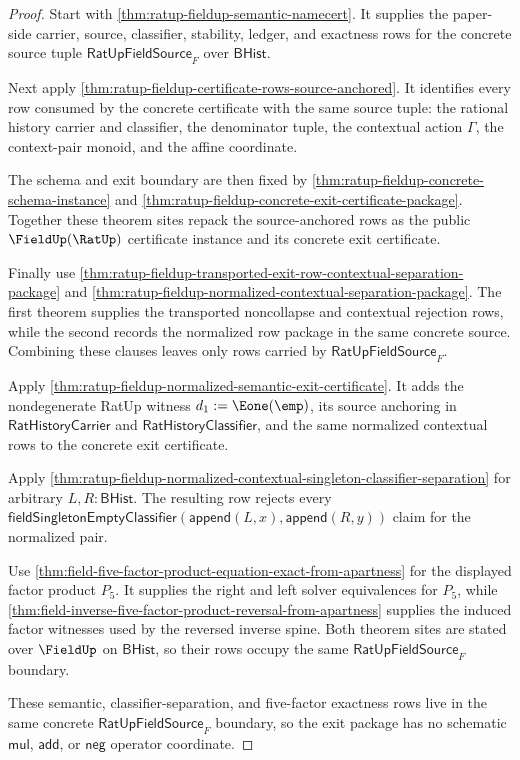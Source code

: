 \begin{proof}
Start with \autoref{thm:ratup-fieldup-semantic-namecert}. It supplies the
paper-side carrier, source, classifier, stability, ledger, and exactness rows
for the concrete source tuple $\mathsf{RatUpFieldSource}_F$ over
$\mathsf{BHist}$.

Next apply \autoref{thm:ratup-fieldup-certificate-rows-source-anchored}. It
identifies every row consumed by the concrete certificate with the same source
tuple: the rational history carrier and classifier, the denominator tuple, the
contextual action $\Gamma$, the context-pair monoid, and the affine coordinate.

The schema and exit boundary are then fixed by
\autoref{thm:ratup-fieldup-concrete-schema-instance} and
\autoref{thm:ratup-fieldup-concrete-exit-certificate-package}. Together these
theorem sites repack the source-anchored rows as the public
$\FieldUp(\RatUp)$ certificate instance and its concrete exit certificate.

Finally use
\autoref{thm:ratup-fieldup-transported-exit-row-contextual-separation-package}
and \autoref{thm:ratup-fieldup-normalized-contextual-separation-package}. The
first theorem supplies the transported noncollapse and contextual rejection
rows, while the second records the normalized row package in the same concrete
source. Combining these clauses leaves only rows carried by
$\mathsf{RatUpFieldSource}_F$.

Apply \autoref{thm:ratup-fieldup-normalized-semantic-exit-certificate}. It
adds the nondegenerate RatUp witness $d_1:=\Eone(\emp)$, its source anchoring in
$\mathsf{RatHistoryCarrier}$ and $\mathsf{RatHistoryClassifier}$, and the same
normalized contextual rows to the concrete exit certificate.

Apply
\autoref{thm:ratup-fieldup-normalized-contextual-singleton-classifier-separation}
for arbitrary $L,R:\mathsf{BHist}$. The resulting row rejects every
$\mathsf{fieldSingletonEmptyClassifier}(\mathsf{append}(L,x),\mathsf{append}(R,y))$
claim for the normalized pair.

Use \autoref{thm:field-five-factor-product-equation-exact-from-apartness} for
the displayed factor product $P_5$. It supplies the right and left solver
equivalences for $P_5$, while
\autoref{thm:field-inverse-five-factor-product-reversal-from-apartness} supplies
the induced factor witnesses used by the reversed inverse spine. Both theorem
sites are stated over $\FieldUp$ on $\mathsf{BHist}$, so their rows occupy the
same $\mathsf{RatUpFieldSource}_F$ boundary.

These semantic, classifier-separation, and five-factor exactness rows live in
the same concrete $\mathsf{RatUpFieldSource}_F$ boundary, so the exit package
has no schematic $\mathsf{mul}$, $\mathsf{add}$, or $\mathsf{neg}$ operator
coordinate.
\end{proof}

